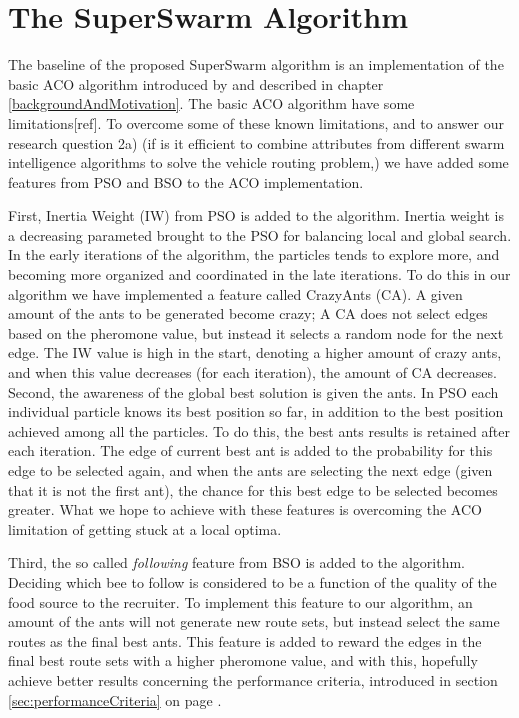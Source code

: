 \section{The SuperSwarm Algorithm}

The baseline of the proposed SuperSwarm algorithm is an implementation of the basic ACO algorithm introduced by \citet{nanda11} and described in chapter \ref{backgroundAndMotivation}. The basic ACO algorithm have some limitations[ref]. To overcome some of these known limitations, and to answer our research question 2a) (if is it efficient to combine attributes from different swarm intelligence algorithms to solve the vehicle routing problem,) we have added some features from PSO and BSO to the ACO implementation.

First, Inertia Weight (IW) from PSO is added to the algorithm. Inertia weight is a decreasing parameted brought to the PSO for balancing local and global search. In the early iterations of the algorithm, the particles tends to explore more, and becoming more organized and coordinated in the late iterations.  To do this in our algorithm we have implemented a feature called CrazyAnts (CA). A given amount of the ants to be generated become crazy; A CA does not select edges based on the pheromone value, but instead it selects a random node for the next edge. The IW value is high in the start, denoting a higher amount of crazy ants, and when this value decreases (for each iteration), the amount of CA decreases. Second, the awareness of the global best solution is given the ants. In PSO each individual particle knows its best position so far, in addition to the best position achieved among all the particles. To do this, the best ants results is retained after each iteration. The edge of current best ant is added to the probability for this edge to be selected again, and when the ants are selecting the next edge (given that it is not the first ant), the chance for this best edge to be selected becomes greater. What we hope to achieve with these features is overcoming the ACO limitation of getting stuck at a local optima.

Third, the so called \textit{following} feature from BSO is added to the algorithm. Deciding which bee to follow is considered to be a function of the quality of the food source to the recruiter. To implement this feature to our algorithm, an amount of the ants will not generate new route sets, but instead select the same routes as the final best ants. This feature is added to reward the edges in the final best route sets with a higher pheromone value, and with this, hopefully achieve better results concerning the performance criteria, introduced in section \ref{sec:performanceCriteria} on page \pageref{sec:performanceCriteria}. 




